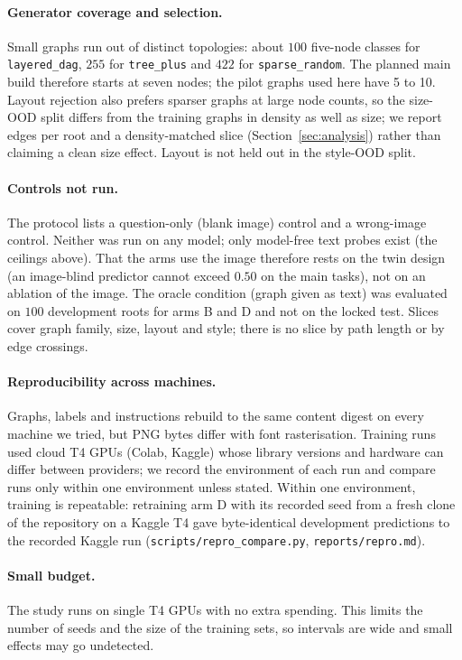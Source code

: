 \paragraph{Generator coverage and selection.}
Small graphs run out of distinct topologies: about $100$ five-node classes for
\texttt{layered\_dag}, $255$ for \texttt{tree\_plus} and $422$ for \texttt{sparse\_random}.
The planned main build therefore starts at seven nodes; the pilot graphs used here have 5 to 10. Layout rejection also prefers sparser
graphs at large node counts, so the size-OOD split differs from the training graphs in
density as well as size; we report edges per root and a density-matched slice
(Section~\ref{sec:analysis}) rather than claiming a clean size effect. Layout is not held
out in the style-OOD split.

\paragraph{Controls not run.}
The protocol lists a question-only (blank image) control and a wrong-image control. Neither
was run on any model; only model-free text probes exist (the ceilings above). That the arms
use the image therefore rests on the twin design (an image-blind predictor cannot exceed
$0.50$ on the main tasks), not on an ablation of the image. The oracle condition (graph given as text) was evaluated on $100$
development roots for arms B and D and not on the locked test. Slices cover graph family,
size, layout and style; there is no slice by path length or by edge crossings.

\paragraph{Reproducibility across machines.}
Graphs, labels and instructions rebuild to the same content digest on every machine we
tried, but PNG bytes differ with font rasterisation. Training runs used cloud T4 GPUs (Colab, Kaggle)
whose library versions and hardware can differ between providers; we record the
environment of each run and compare runs only within one environment unless stated.
Within one environment, training is repeatable: retraining arm D with its recorded seed from a fresh
clone of the repository on a Kaggle T4 gave byte-identical development predictions to the
recorded Kaggle run (\texttt{scripts/repro\_compare.py}, \texttt{reports/repro.md}).

\paragraph{Small budget.}
The study runs on single T4 GPUs with no extra spending. This limits the number of seeds and the size of the
training sets, so intervals are wide and small effects may go undetected.
